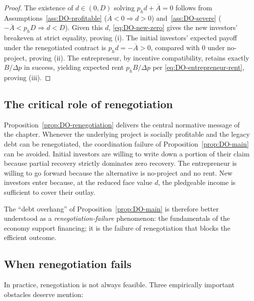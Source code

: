 \documentclass[11pt,a4paper,oneside]{book}
\theoremstyle{plain}
\theoremstyle{definition}
\theoremstyle{remark}
\numberwithin{equation}{chapter}
\begin{document}
\begin{proof}
The existence of $d \in (0, D)$ solving $p_h d + \overline{A} = 0$ follows from Assumptions~\ref{ass:DO-profitable} ($\overline{A} < 0 \Rightarrow d > 0$) and~\ref{ass:DO-severe} ($-\overline{A} < p_h D \Rightarrow d < D$).
Given this $d$, \eqref{eq:DO-new-zero} gives the new investors' breakeven at strict equality, proving (i).
The initial investors' expected payoff under the renegotiated contract is $p_h d = -\overline{A} > 0$, compared with $0$ under no-project, proving (ii).
The entrepreneur, by incentive compatibility, retains exactly $B/\Delta p$ in success, yielding expected rent $p_h B / \Delta p$ per \eqref{eq:DO-entrepreneur-rent}, proving (iii).
\end{proof}

\subsection{The critical role of renegotiation}

Proposition~\ref{prop:DO-renegotiation} delivers the central normative message of the chapter.
Whenever the underlying project is socially profitable and the legacy debt can be renegotiated, the coordination failure of Proposition~\ref{prop:DO-main} can be avoided.
Initial investors are willing to write down a portion of their claim because partial recovery strictly dominates zero recovery.
The entrepreneur is willing to go forward because the alternative is no-project and no rent.
New investors enter because, at the reduced face value $d$, the pledgeable income is sufficient to cover their outlay.

The ``debt overhang'' of Proposition~\ref{prop:DO-main} is therefore better understood as a \emph{renegotiation-failure} phenomenon: the fundamentals of the economy support financing; it is the failure of renegotiation that blocks the efficient outcome.

\subsection{When renegotiation fails}

In practice, renegotiation is not always feasible.
Three empirically important obstacles deserve mention:
\end{document}
